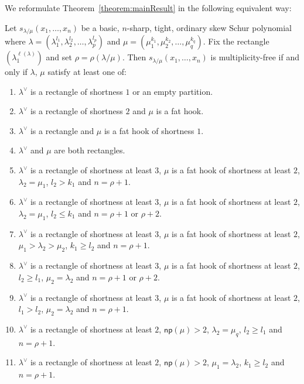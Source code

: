 \documentclass[ALCO,ThmDefs,Unicode,epreuves]{cedram}
\newcommand{\np}{\mathsf{np}}
\begin{document}
We reformulate Theorem~\ref{theorem:mainResult} in the following equivalent way:


\begin{theorem}
\label{theorem:refomulatedResult}
Let $s_{\lambda / \mu}(x_1,\ldots,x_n)$ be a basic, $n$-sharp, tight, ordinary skew Schur polynomial where $\lambda = (\lambda_1^{l_1},\lambda_2^{l_2},\ldots,\lambda_p^{l_p})$ and $\mu = (\mu_1^{k_1},\mu_2^{k_2},\ldots,\mu_q^{k_q})$. Fix the rectangle $(\lambda_1^{\ell(\lambda)})$ and set $\rho = \rho(\lambda / \mu)$. Then $s_{\lambda / \mu}(x_1,\ldots,x_n)$ is multiplicity-free if and only if $\lambda$, $\mu$ satisfy at least one of:
\begin{enumerate}[label=(\Roman{*})]
	\item\label{theo3.1_1} $\lambda^\vee$ is a rectangle of shortness $1$ or an empty partition.
	\item\label{theo3.1_2} $\lambda^\vee$ is a rectangle of shortness $2$ and $\mu$ is a fat hook.
	\item\label{theo3.1_3} $\lambda^\vee$ is a rectangle and $\mu$ is a fat hook of shortness $1$.
	\item\label{theo3.1_4} $\lambda^\vee$ and $\mu$ are both rectangles.
	\item\label{theo3.1_5} $\lambda^\vee$ is a rectangle of shortness at least $3$, $\mu$ is a fat hook of shortness at least $2$, $\lambda_2 = \mu_1$, $l_2>k_1$ and $n = \rho+1$.
	\item\label{theo3.1_6} $\lambda^\vee$ is a rectangle of shortness at least $3$, $\mu$ is a fat hook of shortness at least $2$, $\lambda_2 = \mu_1$, $l_2\leq k_1$ and $n = \rho+1$ or $\rho+2$.
	\item\label{theo3.1_7} $\lambda^\vee$ is a rectangle of shortness at least $3$, $\mu$ is a fat hook of shortness at least $2$, $\mu_1>\lambda_2>\mu_2$, $k_1\geq l_2$ and $n = \rho+1$.
	\item\label{theo3.1_8} $\lambda^\vee$ is a rectangle of shortness at least $3$, $\mu$ is a fat hook of shortness at least $2$, $l_2\geq l_1$, $\mu_2=\lambda_2$ and $n = \rho+1$ or $\rho+2$.
	\item\label{theo3.1_9} $\lambda^\vee$ is a rectangle of shortness at least $3$, $\mu$ is a fat hook of shortness at least $2$, $l_1> l_2$, $\mu_2=\lambda_2$ and $n = \rho+1$.
	\item\label{theo3.1_10} $\lambda^\vee$ is a rectangle of shortness at least $2$, $\np (\mu)>2$, $\lambda_2 = \mu_q$, $l_2\geq l_1$ and $n = \rho+1$.
	\item\label{theo3.1_11} $\lambda^\vee$ is a rectangle of shortness at least $2$, $\np (\mu) > 2$, $\mu_1 = \lambda_2$, $k_1 \geq l_2$ and $n = \rho+1$.
\end{enumerate}
\end{theorem}
\end{document}

